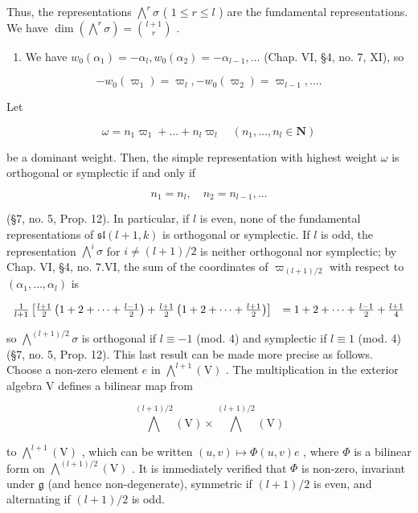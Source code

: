 Thus, the representations \(\bigwedge^{r}\sigma\) ( \(1 \leq r \leq l\) ) are the fundamental representations. We have \(\dim(\bigwedge^{r}\sigma) = \binom{l+1}{r}\) .

\begin{enumerate}
\def\labelenumi{(\Alph{enumi})}
\setcounter{enumi}{21}
\tightlist
\item
  We have \(w_0(\alpha_1) = -\alpha_l, w_0(\alpha_2) = -\alpha_{l-1}, \ldots\) (Chap. VI, §4, no. 7, XI), so
\end{enumerate}

\[
- w _ {0} (\varpi_ {1}) = \varpi_ {l}, - w _ {0} (\varpi_ {2}) = \varpi_ {l - 1}, \ldots .
\]

Let

\[
\omega = n _ {1} \varpi_ {1} + \dots + n _ {l} \varpi_ {l} \quad (n _ {1}, \ldots , n _ {l} \in \mathbf {N})
\]

be a dominant weight. Then, the simple representation with highest weight \(\omega\) is orthogonal or symplectic if and only if

\[
n _ {1} = n _ {l}, \quad n _ {2} = n _ {l - 1}, \ldots
\]

(§7, no. 5, Prop. 12). In particular, if \(l\) is even, none of the fundamental representations of \(\mathfrak{sl}(l + 1,k)\) is orthogonal or symplectic. If \(l\) is odd, the representation \(\bigwedge^i\sigma\) for \(i\neq (l + 1) / 2\) is neither orthogonal nor symplectic; by Chap. VI, §4, no. 7.VI, the sum of the coordinates of \(\varpi_{(l + 1) / 2}\) with respect to \((\alpha_{1},\ldots ,\alpha_{l})\) is

\[
\begin{array}{r l} \frac {1}{l + 1} \left[ \frac {l + 1}{2} \left(1 + 2 + \dots + \frac {l - 1}{2}\right) + \frac {l + 1}{2} \left(1 + 2 + \dots + \frac {l + 1}{2}\right) \right] & = 1 + 2 + \dots + \frac {l - 1}{2} + \frac {l + 1}{4} \end{array}
\]

so \(\bigwedge^{(l + 1) / 2}\sigma\) is orthogonal if \(l\equiv -1\) (mod. 4) and symplectic if \(l\equiv 1\) (mod. 4) (§7, no. 5, Prop. 12). This last result can be made more precise as follows. Choose a non-zero element \(e\) in \(\bigwedge^{l + 1}(\mathrm{V})\) . The multiplication in the exterior algebra \(\mathrm{V}\) defines a bilinear map from

\[
\bigwedge^ {(l + 1) / 2} (\mathrm{V}) \times \bigwedge^ {(l + 1) / 2} (\mathrm{V})
\]

to \(\bigwedge^{l + 1}(\mathrm{V})\) , which can be written \((u,v)\mapsto \varPhi (u,v)e\) , where \(\varPhi\) is a bilinear form on \(\bigwedge^{(l + 1) / 2}(\mathrm{V})\) . It is immediately verified that \(\varPhi\) is non-zero, invariant under \(\mathfrak{g}\) (and hence non-degenerate), symmetric if \((l + 1) / 2\) is even, and alternating if \((l + 1) / 2\) is odd.

